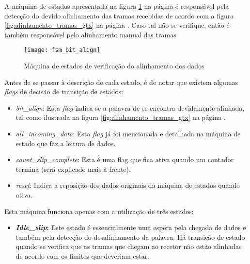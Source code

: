 \begin{enumerate}
	A máquina de estados apresentada na figura \ref{fig:fsm3} na página \pageref{fig:fsm3} é responsável pela detecção do devido alinhamento das tramas recebidas de acordo com a figura \ref{fig:alinhamento_tramas_gtx} na página \pageref{fig:alinhamento_tramas_gtx}. Caso tal não se verifique, então é também responsável pelo alinhamento manual das tramas.
	
		\begin{figure}[h!]
			\begin{center}
				\leavevmode
				\texttt{[image: fsm\_bit\_align]}
				\captionsetup{width=1.0\linewidth}
				\caption[Máquina de estados de verificação do alinhamento dos dados]{Máquina de estados de verificação do alinhamento dos dados}
				\label{fig:fsm3}
		\end{center}
	\end{figure}
	
	Antes de se passar à descrição de cada estado, é de notar que existem algumas \textit{flags} de decisão de transição de estados:
	\begin{itemize}
		\item \textit{bit\_align}: Esta \textit{flag} indica se a palavra de se encontra devidamente alinhada, tal como ilustrada na figura \ref{fig:alinhamento_tramas_gtx} na página \pageref{fig:alinhamento_tramas_gtx}. 
		
		\item \textit{all\_incoming\_data}: Esta \textit{flag} já foi mencionada e detalhada na máquina de estado que faz a leitura de dados.
		
		\item \textit{count\_slip\_complete}: Esta é uma flag que fica ativa quando um contador termina (será explicado mais à frente).
		
		\item \textit{reset}: Indica a reposição dos dados originais da máquina de estados quando ativa.
	\end{itemize}
	
	
	Esta máquina funciona apenas com a utilização de três estados:
	\begin{itemize}
		\item \textbf{\textit{Idle\_slip}:} Este estado é essencialmente uma espera pela chegada de dados e também pela detecção do desalinhamento da palavra. Há transição de estado quando se verifica que as tramas que chegam ao recetor não estão alinhadas de acordo com os limites que deveriam estar.
		

\end{itemize}
\end{enumerate}
